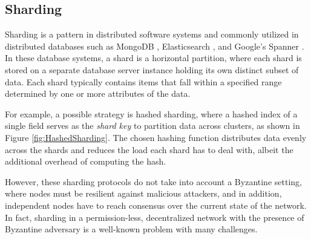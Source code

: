 \subsection{Sharding}

Sharding is a pattern \parencite{ShardingPatternMS} in distributed software systems and commonly utilized in distributed databases such as MongoDB \parencite{MongoDBSharding}, Elasticsearch \parencite{ElasticsearchSharding}, and Google's Spanner \parencite{Spanner2013}. In these database systems, a shard is a horizontal partition, where each shard is stored on a separate database server instance holding its own distinct subset of data. Each shard typically contains items that fall within a specified range determined by one or more attributes of the data. 

For example, a possible strategy is hashed sharding, where a hashed index of a single field serves as the \textit{shard key} to partition data across clusters, as shown in Figure \ref{fig:HashedSharding}. The chosen hashing function distributes data evenly across the shards and reduces the load each shard has to deal with, albeit the additional overhead of computing the hash. 

However, these sharding protocols do not take into account a Byzantine setting, where nodes must be resilient against malicious attackers, and in addition, independent nodes have to reach consensus over the current state of the network. In fact, sharding in a permission-less, decentralized network with the presence of Byzantine adversary is a well-known problem \parencite{Luu2016} with many challenges.

